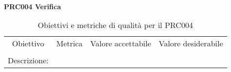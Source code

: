 \documentclass[../piano-di-qualifica.tex]{subfiles}
\begin{document}
        \begin{center}
            \centering
            \textbf{PRC004 Verifica}
        \end{center}
            \begin{table}[H]
                \centering
                \begin{tabular}{cccc}
                Obiettivo    & Metrica & Valore accettabile & Valore desiderabile \\
                             &         &                    &                    \\
                Descrizione: & \multicolumn{3}{c}{}        
                \end{tabular}
                \caption{Obiettivi e metriche di qualità per il PRC004}
            \end{table}
\end{document}
